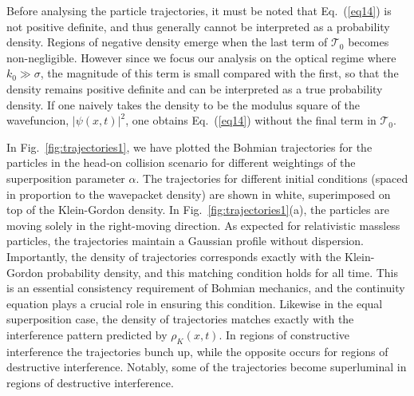\documentclass[
prx
,twocolumn
,nofootinbib
,floatfix
,superscriptaddress
]{revtex4-2}
\begin{document}
Before analysing the particle trajectories, it must be noted that Eq.\ (\ref{eq14}) is not positive definite, and thus generally cannot be interpreted as a probability density. Regions of negative density emerge when the last term of $\mathcal{T}_0$ becomes non-negligible. However since we focus our analysis on the optical regime where $k_0 \gg \sigma$, the magnitude of this term is small compared with the first, so that the density remains positive definite and can be interpreted as a true probability density. If one naively takes the density to be the modulus square of the wavefuncion, $| \psi(x,t)|^2$, one obtains Eq.\ (\ref{eq14}) without the final term in $\mathcal{T}_0$. 

In Fig.\ \ref{fig:trajectories1}, we have plotted the Bohmian trajectories for the particles in the head-on collision scenario for different weightings of the superposition parameter $\alpha$. The trajectories for different initial conditions (spaced in proportion to the wavepacket density) are shown in white, superimposed on top of the Klein-Gordon density. In Fig.\ \ref{fig:trajectories1}(a), the particles are moving solely in the right-moving direction. As expected for relativistic massless particles, the trajectories maintain a Gaussian profile without dispersion. Importantly, the density of trajectories corresponds exactly with the Klein-Gordon probability density, and this matching condition holds for all time. This is an essential consistency requirement of Bohmian mechanics, and the continuity equation plays a crucial role in ensuring this condition. Likewise in the equal superposition case, the density of trajectories matches exactly with the interference pattern predicted by $\rho_K(x,t)$. In regions of constructive interference the trajectories bunch up, while the opposite occurs for regions of destructive interference. Notably, some of the trajectories become superluminal in regions of destructive interference. 
\end{document}
